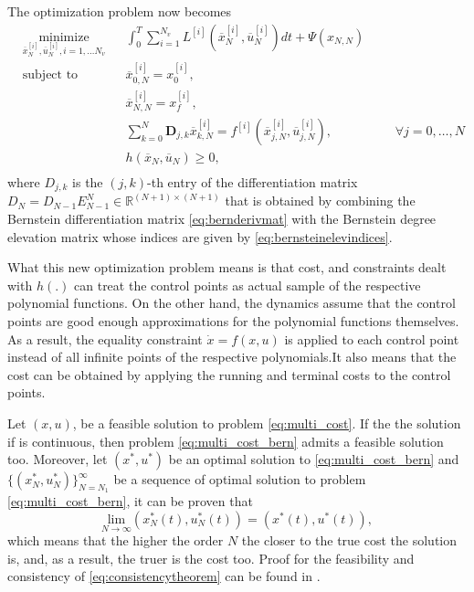 \par The optimization problem now becomes 
\begin{equation}
    \label{eq:multi_cost_bern}
    \begin{aligned}
    & \underset{\overline{x}_N^{[i]},\overline{u}_N^{[i]},i= 1,\dots N_v}{\text{minimize}} && \int_0^T \sum_{i=1}^{N_v}  L^{[i]} (\overline{x}_N^{[i]},\overline{u}_N^{[i]})dt + \Psi (x_{N,N}) \\
    & \text{subject to}  && \overline{x}^{[i]}_{0,N} = x_0^{[i]}, \\
        & && \overline{x}^{[i]}_{N,N} = x_f^{[i]}, \\
		& && \sum_{k=0}^{N} \boldsymbol{D}_{j,k} \overline{x}_{k,N}^{[i]} = f^{[i]} (\overline{x}^{[i]}_{j,N},\overline{u}^{[i]}_{j,N}), &&& \forall j=0,\dots,N\\
        & && h(\overline{x}_N,\overline{u}_N) \geq 0, \\
    \end{aligned}
\end{equation}
where $D_{j,k}$ is the $(j,k)$-th entry of the differentiation matrix $D_N = D_{N-1}E^N_{N-1}\in \mathbb{R}^{(N+1)\times(N+1)}$ that is obtained by combining the Bernstein differentiation matrix \eqref{eq:bernderivmat} with the Bernstein degree elevation matrix whose indices are given by \eqref{eq:bernsteinelevindices}.
\par What this new optimization problem means is that cost, and constraints dealt with $h(.)$ can treat the control points as actual sample of the respective polynomial functions. On the other hand, the dynamics assume that the control points are good enough approximations for the polynomial functions themselves. As a result, the equality constraint $\dot{x}=f(x,u)$ is applied to each control point instead of all infinite points of the respective polynomials.It also means that the cost can be obtained by applying the running and terminal costs to the control points.
\par Let $(x,u)$, be a feasible solution to problem \ref{eq:multi_cost}. If the the solution if is continuous, then problem \ref{eq:multi_cost_bern} admits a feasible solution too. Moreover, let $(x^*,u^*)$ be an optimal solution to \ref{eq:multi_cost_bern} and $\{(x_N^*,u_N^*)\}^\infty_{N=N_1}$ be a sequence of optimal solution to problem \ref{eq:multi_cost_bern}, it can be proven that 
\begin{equation}
    \underset{N\rightarrow\infty}{\text{lim}} (x^*_N(t),u^*_N(t)) = (x^*(t),u^*(t)),
    \label{eq:consistencytheorem}
\end{equation}
which means that the higher the order $N$ the closer to the true cost the solution is, and, as a result, the truer is the cost too. Proof for the feasibility and consistency of \eqref{eq:consistencytheorem} can be found in \cite{cichella2018bernstein}.


